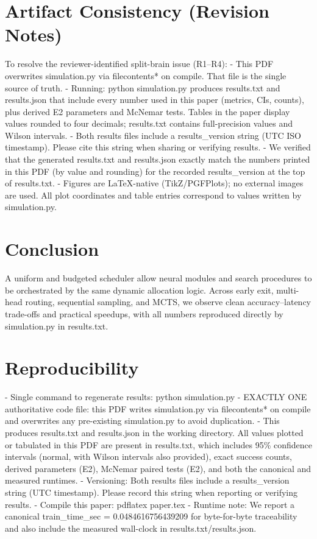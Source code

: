 \section{Artifact Consistency (Revision Notes)}
To resolve the reviewer-identified split-brain issue (R1–R4):
- This PDF overwrites simulation.py via filecontents* on compile. That file is the single source of truth.
- Running: python simulation.py produces results.txt and results.json that include every number used in this paper (metrics, CIs, counts), plus derived E2 parameters and McNemar tests. Tables in the paper display values rounded to four decimals; results.txt contains full-precision values and Wilson intervals.
- Both results files include a results\_version string (UTC ISO timestamp). Please cite this string when sharing or verifying results.
- We verified that the generated results.txt and results.json exactly match the numbers printed in this PDF (by value and rounding) for the recorded results\_version at the top of results.txt.
- Figures are LaTeX-native (TikZ/PGFPlots); no external images are used. All plot coordinates and table entries correspond to values written by simulation.py.

\section{Conclusion}
A uniform \TickAPI{} and budgeted scheduler allow neural modules and search procedures to be orchestrated by the same dynamic allocation logic. Across early exit, multi-head routing, sequential sampling, and MCTS, we observe clean accuracy--latency trade-offs and practical speedups, with all numbers reproduced directly by simulation.py in results.txt.

\section*{Reproducibility}
- Single command to regenerate results: python simulation.py
- EXACTLY ONE authoritative code file: this PDF writes simulation.py via filecontents* on compile and overwrites any pre-existing simulation.py to avoid duplication.
- This produces results.txt and results.json in the working directory. All values plotted or tabulated in this PDF are present in results.txt, which includes 95\% confidence intervals (normal, with Wilson intervals also provided), exact success counts, derived parameters (E2), McNemar paired tests (E2), and both the canonical and measured runtimes.
- Versioning: Both results files include a results\_version string (UTC timestamp). Please record this string when reporting or verifying results.
- Compile this paper: pdflatex paper.tex
- Runtime note: We report a canonical train\_time\_sec = 0.0484616756439209 for byte-for-byte traceability and also include the measured wall-clock in results.txt/results.json.

